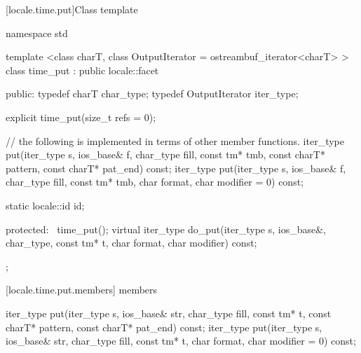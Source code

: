 [locale.time.put]{Class template }

%
\begin{codeblock}
namespace std {
  template <class charT, class OutputIterator = ostreambuf_iterator<charT> >
  class time_put : public locale::facet {
  public:
    typedef charT            char_type;
    typedef OutputIterator   iter_type;

    explicit time_put(size_t refs = 0);

    // the following is implemented in terms of other member functions.
    iter_type put(iter_type s, ios_base& f, char_type fill, const tm* tmb,
                  const charT* pattern, const charT* pat_end) const;
    iter_type put(iter_type s, ios_base& f, char_type fill,
                  const tm* tmb, char format, char modifier = 0) const;

    static locale::id id;

  protected:
    ~time_put();
    virtual iter_type do_put(iter_type s, ios_base&, char_type, const tm* t,
                             char format, char modifier) const;
  };
}
\end{codeblock}

[locale.time.put.members]{ members}

%
%
\begin{itemdecl}
iter_type put(iter_type s, ios_base& str, char_type fill, const tm* t,
              const charT* pattern, const charT* pat_end) const;
iter_type put(iter_type s, ios_base& str, char_type fill, const tm* t,
              char format, char modifier = 0) const;
\end{itemdecl}


